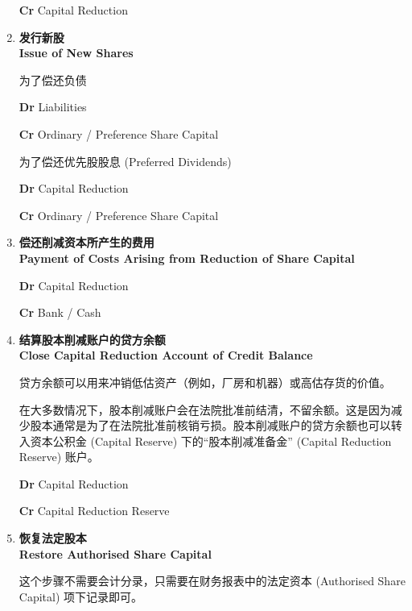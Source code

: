 \documentclass{article}
\begin{document}
\begin{enumerate}
\begin{mdframed}[backgroundcolor=gray!10]
    \hspace{1.7em}\textbf{Cr} Capital Reduction
    \end{mdframed}

    \item \textbf{发行新股\\Issue of New Shares}
    
    为了偿还负债
    \begin{mdframed}[backgroundcolor=gray!10]
    \textbf{Dr} Liabilities

    \hspace{1.7em}\textbf{Cr} Ordinary / Preference Share Capital
    \end{mdframed}

    为了偿还优先股股息 (Preferred Dividends)
    \begin{mdframed}[backgroundcolor=gray!10]
    \textbf{Dr} Capital Reduction

    \hspace{1.7em}\textbf{Cr} Ordinary / Preference Share Capital
    \end{mdframed}

    \newpage
    \item \textbf{偿还削减资本所产生的费用\\Payment of Costs Arising from Reduction of Share Capital}
    
    \begin{mdframed}[backgroundcolor=gray!10]
    \textbf{Dr} Capital Reduction

    \hspace{1.7em}\textbf{Cr} Bank / Cash
    \end{mdframed}

    \item \textbf{结算股本削减账户的贷方余额\\Close Capital Reduction Account of Credit Balance}
    
    贷方余额可以用来冲销低估资产（例如，厂房和机器）或高估存货的价值。
    
    在大多数情况下，股本削减账户会在法院批准前结清，不留余额。这是因为减少股本通常是为了在法院批准前核销亏损。股本削减账户的贷方余额也可以转入资本公积金 (Capital Reserve) 下的“股本削减准备金” (Capital Reduction Reserve) 账户。
    \begin{mdframed}[backgroundcolor=gray!10]
    \textbf{Dr} Capital Reduction

    \hspace{1.7em}\textbf{Cr} Capital Reduction Reserve
    \end{mdframed}

    \item \textbf{恢复法定股本\\Restore Authorised Share Capital}
    
    这个步骤不需要会计分录，只需要在财务报表中的法定资本 (Authorised Share Capital) 项下记录即可。

\end{enumerate}
\end{document}
